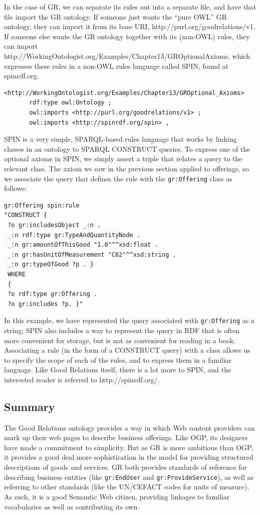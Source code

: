 In the case of GR, we can separate its rules out into a separate file,
and have that file import the GR ontology. If someone just wants the
``pure OWL'' GR ontology, they can import it from its base URI,
http://purl.org/goodrelations/v1.
If someone else wants the GR ontology together with its (non-OWL) rules,
they can import
http://WorkingOntologist.org/Examples/Chapter13/GROptionalAxioms,
which expresses these rules in a non-OWL rules language called SPIN,
found at spinrdf.org.

\begin{lstlisting}
<http://WorkingOntologist.org/Examples/Chapter13/GROptional_Axioms>
       rdf:type owl:Ontology ;
       owl:imports <http://purl.org/goodrelations/v1> ;
       owl:imports <http://spinrdf.org/spin> ,
\end{lstlisting}

SPIN is a very simple, SPARQL-based rules language that works by linking
classes in an ontology to SPARQL CONSTRUCT queries. To express one of
the optional axioms in SPIN, we simply assert a triple that relates a
query to the relevant class. The axiom we saw in the previous section
applied to offerings, so we associate the query that defines the rule
with the \texttt{gr:Offering} class as follows:

\begin{lstlisting}
gr:Offering spin:rule
"CONSTRUCT {
 ?o gr:includesObject _:n .
 _:n rdf:type gr:TypeAndQuantityNode .
 _:n gr:amountOfThisGood "1.0"^^xsd:float .
 _:n gr:hasUnitOfMeasurement "C62"^^xsd:string .
 _:n gr:typeOfGood ?p . }
 WHERE
 {
 ?o rdf:type gr:Offering .
 ?o gr:includes ?p. }"
\end{lstlisting}

In this example, we have represented the query associated with
\texttt{gr:Offering} as a string; SPIN also includes a way to represent the query
in RDF that is often more convenient for storage, but is not as
convenient for reading in a book. Associating a rule (in the form of a
CONSTRUCT query) with a class allows us to specify the scope of each of
the rules, and to express them in a familiar language. Like Good
Relations itself, there is a lot more to SPIN, and the interested reader
is referred to http://spinrdf.org/.

\subsection{Summary}

The Good Relations ontology provides a way in which Web content
providers can mark up their web pages to describe business offerings.
Like OGP, its designers have made a commitment to simplicity. But as GR
is more ambitious than OGP, it provides a good deal more sophistication
in the model for providing structured descriptions of goods and
services. GR both provides standards of reference for describing
business entities (like \texttt{gr:EndUser} and \texttt{gr:ProvideService}), as well as
referring to other standards (like the UN/CEFACT codes for units of
measure). As such, it is a good Semantic Web citizen, providing linkages
to familiar vocabularies as well as contributing its own.

